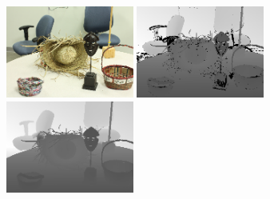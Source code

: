 \begin{figure}[htb]
\begin{minipage}[b]{0.3\linewidth}
  \centering
  \centerline{\includegraphics[width=4.2cm]{depth_interp/quali_rst/img_Mask-perfect.png}}
\end{minipage}
%
\hfill
\begin{minipage}[b]{0.3\linewidth}
  \centering
  \centerline{\includegraphics[width=4.2cm]{depth_interp/quali_rst/n_hf_Mask-perfect.png}}
\end{minipage}
\hfill
\begin{minipage}[b]{0.3\linewidth}
  \centering
  \centerline{\includegraphics[width=4.2cm]{depth_interp/quali_rst/hf_Mask-perfect.png}}

\end{minipage}
\end{figure}
